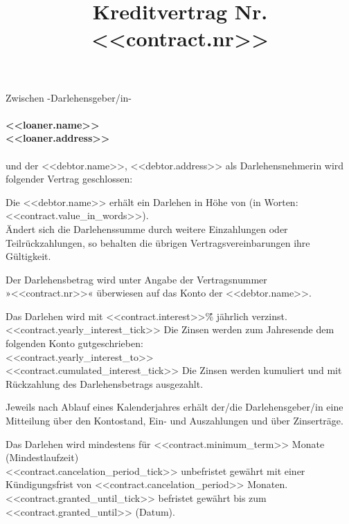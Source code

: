\documentclass[]{scrartcl}
\title{\vspace{-10pt}Kreditvertrag Nr. <<contract.nr>>\vspace{-30pt}}
\date{}
\begin{document}
\maketitle \thispagestyle{fancy}

\noindent Zwischen -Darlehensgeber/in- \\ \\
 \textbf{<<loaner.name>>\\ <<loaner.address>>}  \\ \\
und der <<debtor.name>>, <<debtor.address>> als Darlehensnehmerin wird folgender Vertrag geschlossen:

\begin{contract}


Die <<debtor.name>> erhält ein Darlehen in Höhe von \textbf{} (in Worten: <<contract.value_in_words>>). \\
Ändert sich die Darlehenssumme durch weitere Einzahlungen oder Teilrückzahlungen, so behalten die
übrigen Vertragsvereinbarungen ihre Gültigkeit.

Der Darlehensbetrag wird unter Angabe der Vertragsnummer »<<contract.nr>>« überwiesen auf das Konto der <<debtor.name>>.

Das Darlehen wird  mit <<contract.interest>>\~\% jährlich verzinst. \\
<<contract.yearly_interest_tick>> Die Zinsen werden zum Jahresende dem folgenden Konto gutgeschrieben: \\<<contract.yearly_interest_to>> \\
<<contract.cumulated_interest_tick>> Die Zinsen werden kumuliert und mit Rückzahlung des Darlehensbetrags ausgezahlt.

Jeweils nach Ablauf eines Kalenderjahres erhält der/die Darlehensgeber/in eine Mitteilung über den
Kontostand, Ein- und Auszahlungen und über Zinserträge.

Das Darlehen wird mindestens für <<contract.minimum_term>> Monate (Mindestlaufzeit) \\
 <<contract.cancelation_period_tick>> unbefristet gewährt mit einer Kündigungsfrist von <<contract.cancelation_period>> Monaten. \\
 <<contract.granted_until_tick>> befristet gewährt bis zum <<contract.granted_until>> (Datum).


\end{contract}
\end{document}
